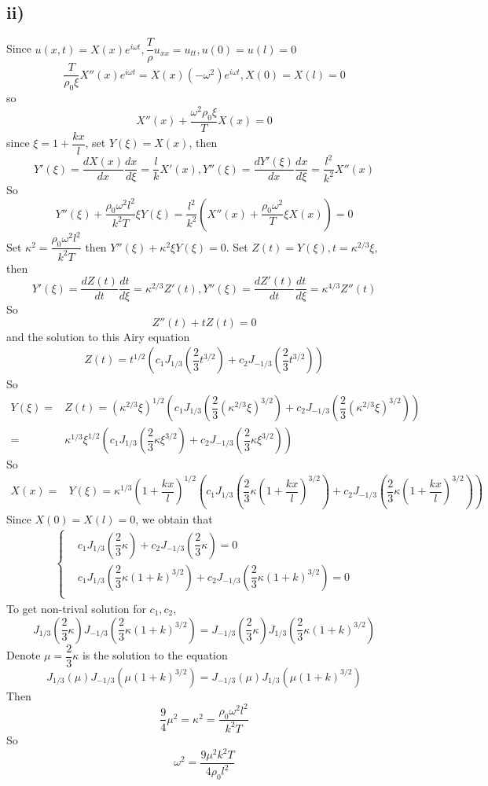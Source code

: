 \documentclass[a4paper,12pt,titlepage]{article}
\begin{document}
\subsection*{ii)}
Since $u(x,t) = X(x)e^{i\omega t},\dfrac{T}{\rho}u_{xx}=u_{tt},u(0)=u(l)=0$
$$\dfrac{T}{\rho_0\xi}X''(x)e^{i\omega t}=X(x)(-\omega^2)e^{i\omega t},X(0)=X(l)=0$$
so
$$X''(x)+\dfrac{\omega^2\rho_0\xi}{T}X(x)=0$$
since $\xi=1+\dfrac{kx}{l}$, set $Y(\xi)=X(x)$, then
$$Y'(\xi)=\dfrac{dX(x)}{dx}\dfrac{dx}{d\xi}=\dfrac{l}{k}X'(x),Y''(\xi)=\dfrac{dY'(\xi)}{dx}\dfrac{dx}{d\xi}=\dfrac{l^2}{k^2}X''(x)$$
So
$$Y''(\xi)+\dfrac{\rho_0\omega^2l^2}{k^2T}\xi Y(\xi)=\dfrac{l^2}{k^2}(X''(x)+\dfrac{\rho_0\omega^2}{T}\xi X(x))=0$$
Set $\kappa^2=\dfrac{\rho_0\omega^2l^2}{k^2T}$ then $Y''(\xi)+\kappa^2\xi Y(\xi)=0$. Set $Z(t)=Y(\xi),t=\kappa^{2/3}\xi$, then
$$Y'(\xi)=\dfrac{dZ(t)}{dt}\dfrac{dt}{d\xi}=\kappa^{2/3}Z'(t),Y''(\xi)=\dfrac{dZ'(t)}{dt}\dfrac{dt}{d\xi}=\kappa^{4/3}Z''(t)$$
So
$$Z''(t)+tZ(t)=0$$
and the solution to this Airy equation 
\begin{align*}
Z(t)=t^{1/2}(c_1J_{1/3}(\dfrac{2}{3}t^{3/2})+c_2J_{-1/3}(\dfrac{2}{3}t^{3/2}))
\end{align*}
So
\begin{align*}
Y(\xi)=&Z(t)=(\kappa^{2/3}\xi)^{1/2}(c_1J_{1/3}(\dfrac{2}{3}(\kappa^{2/3}\xi)^{3/2})+c_2J_{-1/3}(\dfrac{2}{3}(\kappa^{2/3}\xi)^{3/2}))\\
=&\kappa^{1/3}\xi^{1/2}(c_1J_{1/3}(\dfrac{2}{3}\kappa\xi^{3/2})+c_2J_{-1/3}(\dfrac{2}{3}\kappa\xi^{3/2}))
\end{align*}
So
\begin{align*}
X(x)=&Y(\xi)=\kappa^{1/3}(1+\dfrac{kx}{l})^{1/2}(c_1J_{1/3}(\dfrac{2}{3}\kappa(1+\dfrac{kx}{l})^{3/2})+c_2J_{-1/3}(\dfrac{2}{3}\kappa(1+\dfrac{kx}{l})^{3/2}))
\end{align*}
Since $X(0)=X(l)=0$, we obtain that
\begin{align*}
\left\{
\begin{aligned}
&c_1J_{1/3}(\dfrac{2}{3}\kappa)+c_2J_{-1/3}(\dfrac{2}{3}\kappa)=0\\
&c_1J_{1/3}(\dfrac{2}{3}\kappa(1+k)^{3/2})+c_2J_{-1/3}(\dfrac{2}{3}\kappa(1+k)^{3/2})=0\\
\end{aligned}
\right.
\end{align*}
To get non-trival solution for $c_1,c_2$, 
$$J_{1/3}(\dfrac{2}{3}\kappa)J_{-1/3}(\dfrac{2}{3}\kappa(1+k)^{3/2})=J_{-1/3}(\dfrac{2}{3}\kappa)J_{1/3}(\dfrac{2}{3}\kappa(1+k)^{3/2})$$
Denote $\mu=\dfrac{2}{3}\kappa$ is the solution to the equation 
$$J_{1/3}(\mu)J_{-1/3}(\mu(1+k)^{3/2})=J_{-1/3}(\mu)J_{1/3}(\mu(1+k)^{3/2})$$
Then
$$\dfrac{9}{4}\mu^2=\kappa^2=\dfrac{\rho_0\omega^2l^2}{k^2T}$$
So
$$\omega^2=\dfrac{9\mu^2k^2T}{4\rho_0l^2}$$
\end{document}
